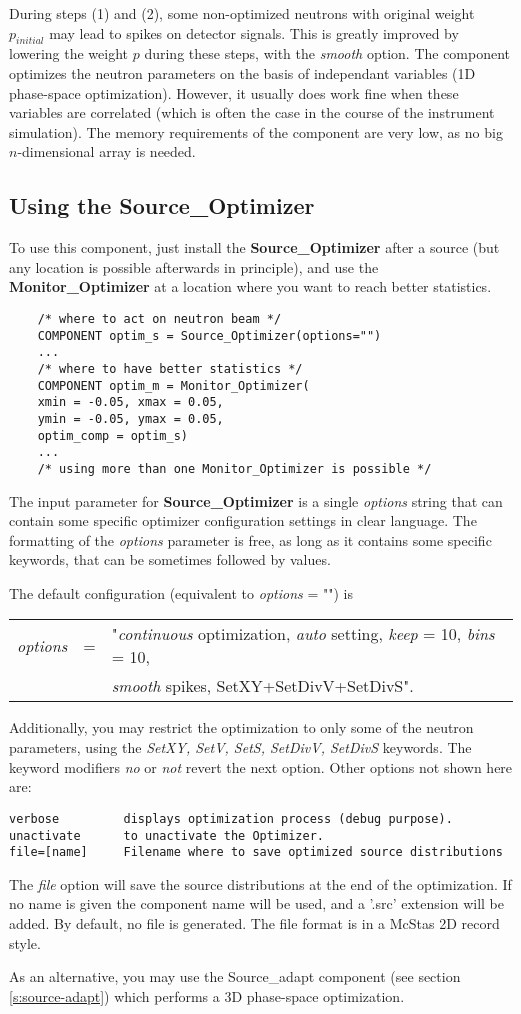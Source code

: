 During steps (1) and (2), some non-optimized neutrons with original
weight $p_{initial}$ may lead to spikes on detector signals. This is
greatly improved by lowering the weight $p$ during these steps, with the
{\it smooth} option.
The component optimizes the neutron parameters on the basis of
independant variables (1D phase-space optimization). However, it usually does work fine when these
variables are correlated (which is often the case in the course of the
instrument simulation).
The memory requirements of the component are very low, as no big
$n$-dimensional array is needed.

\subsection{Using the Source\_Optimizer}

To use this component, just install the {\bf Source\_Optimizer} after a
source (but any location is possible afterwards in principle), and use the {\bf
  Monitor\_Optimizer} at a location where you want to reach better
statistics.

\begin{verbatim}
    /* where to act on neutron beam */
    COMPONENT optim_s = Source_Optimizer(options="")
    ...
    /* where to have better statistics */
    COMPONENT optim_m = Monitor_Optimizer(
    xmin = -0.05, xmax = 0.05,
    ymin = -0.05, ymax = 0.05,
    optim_comp = optim_s)
    ...
    /* using more than one Monitor_Optimizer is possible */
\end{verbatim}

The input parameter for {\bf Source\_Optimizer} is a single {\it
  options} string that can contain some specific optimizer configuration
settings in clear language. The formatting of the {\it options}
parameter is free, as long as it contains some specific keywords, that
can be sometimes followed by values.

The default configuration (equivalent to {\it options} = "") is
\begin{center}
\begin{tabular}{rcl}
  {\it options} & = & "{\it continuous} optimization,
  {\it auto} setting, {\it keep} = 10, {\it bins} = 10, \\
  & & {\it smooth} spikes, SetXY+SetDivV+SetDivS".
\end{tabular}
\end{center}
Additionally, you may restrict the optimization to only some of the neutron parameters, using the {\it SetXY, SetV, SetS, SetDivV, SetDivS} keywords.
The keyword modifiers {\it no} or {\it not} revert the next option.
Other options not shown here are:
\begin{verbatim}
verbose         displays optimization process (debug purpose).
unactivate      to unactivate the Optimizer.
file=[name]     Filename where to save optimized source distributions
\end{verbatim}
The {\it file} option will save the source distributions at the end of
the optimization. If no name is given the component name will be used,
and a '.src' extension will be added. By default, no file is generated.
The file format is in a McStas 2D record style.

As an alternative, you may use the Source\_adapt component 
(see section \ref{s:source-adapt}) which performs 
a 3D phase-space optimization.
